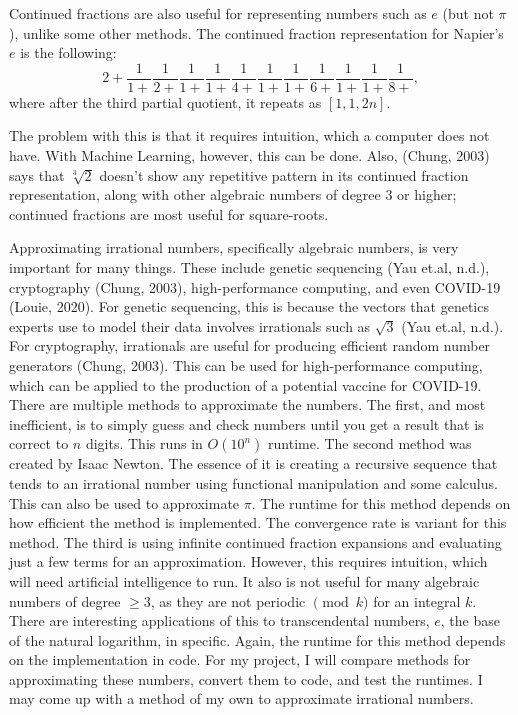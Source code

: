 \documentclass{article}
\begin{document}
\par Continued fractions are also useful for representing numbers such as $e$ (but not $\pi$), unlike some other methods. The continued fraction representation for Napier's $e$ is the following:
$$2+\frac{1}{1+}\frac{1}{2+}\frac{1}{1+}\frac{1}{1+}\frac{1}{4+}\frac{1}{1+}\frac{1}{1+}\frac{1}{6+}\frac{1}{1+}\frac{1}{1+}\frac{1}{8+},$$
where after the third partial quotient, it repeats as $[1,1,2n]$.
\par The problem with this is that it requires intuition, which a computer does not have. With Machine Learning, however, this can be done. Also, (Chung, 2003) says that $\sqrt[3]{2}$ doesn't show any repetitive pattern in its continued fraction representation, along with other algebraic numbers of degree 3 or higher; continued fractions are most useful for square-roots. 
\par Approximating irrational numbers, specifically algebraic numbers, is very important for many things. These include genetic sequencing (Yau et.al, n.d.), cryptography (Chung, 2003), high-performance computing, and even COVID-19 (Louie, 2020). For genetic sequencing, this is because the vectors that genetics experts use to model their data involves irrationals such as $\sqrt{3}$ (Yau et.al, n.d.). For cryptography, irrationals are useful for producing efficient random number generators (Chung, 2003). This can be used for high-performance computing, which can be applied to the production of a potential vaccine for COVID-19. There are multiple methods to approximate the numbers. The first, and most inefficient, is to simply guess and check numbers until you get a result that is correct to $n$ digits. This runs in $O(10^n)$ runtime. The second method was created by Isaac Newton. The essence of it is creating a recursive sequence that tends to an irrational number using functional manipulation and some calculus. This can also be used to approximate $\pi$. The runtime for this method depends on how efficient the method is implemented. The convergence rate is variant for this method. The third is using infinite continued fraction expansions and evaluating just a few terms for an approximation. However, this requires intuition, which will need artificial intelligence to run. It also is not useful for many algebraic numbers of degree $\ge 3$, as they are not periodic $\pmod{k}$ for an integral $k$. There are interesting applications of this to transcendental numbers, $e$, the base of the natural logarithm, in specific. Again, the runtime for this method depends on the implementation in code. For my project, I will compare methods for approximating these numbers, convert them to code, and test the runtimes. I may come up with a method of my own to approximate irrational numbers.
\end{document}
